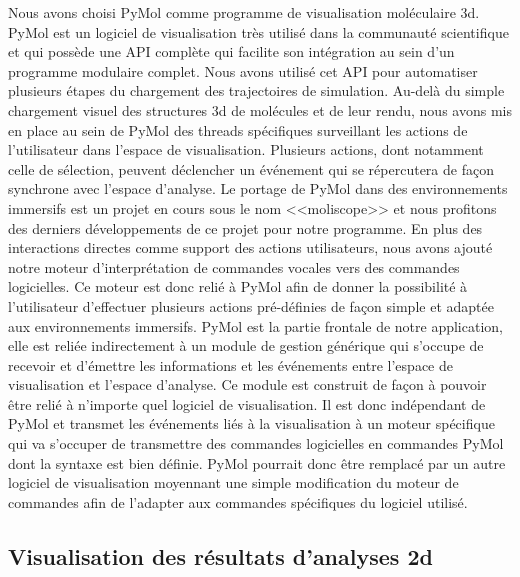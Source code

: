 Nous avons choisi PyMol \cite{delano_pymol_2002} comme programme de visualisation moléculaire 3d. PyMol est un logiciel de visualisation très utilisé dans la communauté scientifique et qui possède une API complète qui facilite son intégration au sein d'un programme modulaire complet. Nous avons utilisé cet API pour automatiser plusieurs étapes du chargement des trajectoires de simulation. Au-delà du simple chargement visuel des structures 3d de molécules et de leur rendu, nous avons mis en place au sein de PyMol des threads spécifiques surveillant les actions de l'utilisateur dans l'espace de visualisation. Plusieurs actions, dont notamment celle de sélection, peuvent déclencher un événement qui se répercutera de façon synchrone avec l'espace d'analyse. Le portage de PyMol dans des environnements immersifs est un projet en cours sous le nom <<moliscope>> et nous profitons des derniers développements de ce projet pour notre programme.
En plus des interactions directes comme support des actions utilisateurs, nous avons ajouté notre moteur d'interprétation de commandes vocales vers des commandes logicielles. Ce moteur est donc relié à PyMol afin de donner la possibilité à l'utilisateur d'effectuer plusieurs actions pré-définies de façon simple et adaptée aux environnements immersifs.
PyMol est la partie frontale de notre application, elle est reliée indirectement à un module de gestion générique qui s'occupe de recevoir et d'émettre les informations et les événements entre l'espace de visualisation et l'espace d'analyse. Ce module est construit de façon à pouvoir être relié à n'importe quel logiciel de visualisation. Il est donc indépendant de PyMol et transmet les événements liés à la visualisation à un moteur spécifique qui va s'occuper de transmettre des commandes logicielles en commandes PyMol dont la syntaxe est bien définie. PyMol pourrait donc être remplacé par un autre logiciel de visualisation moyennant une simple modification du moteur de commandes afin de l'adapter aux commandes spécifiques du logiciel utilisé.

\subsection{Visualisation des résultats d'analyses 2d}

